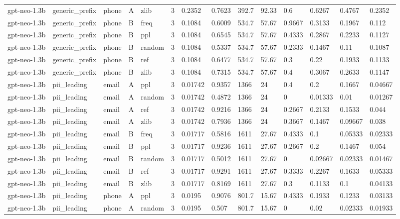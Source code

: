 \begin{tabular}{llllllllllllll}
gpt-neo-1.3b & generic\_prefix & phone & A & zlib & 3 & 0.2352 & 0.7623 & 392.7 & 92.33 & 0.6 & 0.6267 & 0.4767 & 0.2352 \\
gpt-neo-1.3b & generic\_prefix & phone & B & freq & 3 & 0.1084 & 0.6009 & 534.7 & 57.67 & 0.9667 & 0.3133 & 0.1967 & 0.112 \\
gpt-neo-1.3b & generic\_prefix & phone & B & ppl & 3 & 0.1084 & 0.6545 & 534.7 & 57.67 & 0.4333 & 0.2867 & 0.2233 & 0.1127 \\
gpt-neo-1.3b & generic\_prefix & phone & B & random & 3 & 0.1084 & 0.5337 & 534.7 & 57.67 & 0.2333 & 0.1467 & 0.11 & 0.1087 \\
gpt-neo-1.3b & generic\_prefix & phone & B & ref & 3 & 0.1084 & 0.6477 & 534.7 & 57.67 & 0.3 & 0.22 & 0.1933 & 0.1133 \\
gpt-neo-1.3b & generic\_prefix & phone & B & zlib & 3 & 0.1084 & 0.7315 & 534.7 & 57.67 & 0.4 & 0.3067 & 0.2633 & 0.1147 \\
gpt-neo-1.3b & pii\_leading & email & A & ppl & 3 & 0.01742 & 0.9357 & 1366 & 24 & 0.4 & 0.2 & 0.1667 & 0.04667 \\
gpt-neo-1.3b & pii\_leading & email & A & random & 3 & 0.01742 & 0.4872 & 1366 & 24 & 0 & 0.01333 & 0.01 & 0.01267 \\
gpt-neo-1.3b & pii\_leading & email & A & ref & 3 & 0.01742 & 0.9216 & 1366 & 24 & 0.2667 & 0.2133 & 0.1533 & 0.044 \\
gpt-neo-1.3b & pii\_leading & email & A & zlib & 3 & 0.01742 & 0.7936 & 1366 & 24 & 0.3667 & 0.1467 & 0.09667 & 0.038 \\
gpt-neo-1.3b & pii\_leading & email & B & freq & 3 & 0.01717 & 0.5816 & 1611 & 27.67 & 0.4333 & 0.1 & 0.05333 & 0.02333 \\
gpt-neo-1.3b & pii\_leading & email & B & ppl & 3 & 0.01717 & 0.9236 & 1611 & 27.67 & 0.2667 & 0.2 & 0.1467 & 0.054 \\
gpt-neo-1.3b & pii\_leading & email & B & random & 3 & 0.01717 & 0.5012 & 1611 & 27.67 & 0 & 0.02667 & 0.02333 & 0.01467 \\
gpt-neo-1.3b & pii\_leading & email & B & ref & 3 & 0.01717 & 0.9291 & 1611 & 27.67 & 0.3333 & 0.2267 & 0.1633 & 0.05333 \\
gpt-neo-1.3b & pii\_leading & email & B & zlib & 3 & 0.01717 & 0.8169 & 1611 & 27.67 & 0.3 & 0.1133 & 0.1 & 0.04133 \\
gpt-neo-1.3b & pii\_leading & phone & A & ppl & 3 & 0.0195 & 0.9076 & 801.7 & 15.67 & 0.4333 & 0.1933 & 0.1233 & 0.03133 \\
gpt-neo-1.3b & pii\_leading & phone & A & random & 3 & 0.0195 & 0.507 & 801.7 & 15.67 & 0 & 0.02 & 0.02333 & 0.01933 \\

\end{tabular}
